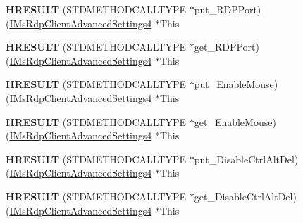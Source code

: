 \begin{DoxyCompactItemize}
{\bfseries H\+R\+E\+S\+U\+LT} (S\+T\+D\+M\+E\+T\+H\+O\+D\+C\+A\+L\+L\+T\+Y\+PE $\ast$put\+\_\+\+R\+D\+P\+Port)(\hyperlink{interface_m_s_t_s_c_lib_1_1_i_ms_rdp_client_advanced_settings4}{I\+Ms\+Rdp\+Client\+Advanced\+Settings4} $\ast$This
\item 
\mbox{\label{struct_m_s_t_s_c_lib_1_1_i_ms_rdp_client_advanced_settings4_vtbl_a57843c0461a2f2fa0a0a93d2d72883d3}} 
{\bfseries H\+R\+E\+S\+U\+LT} (S\+T\+D\+M\+E\+T\+H\+O\+D\+C\+A\+L\+L\+T\+Y\+PE $\ast$get\+\_\+\+R\+D\+P\+Port)(\hyperlink{interface_m_s_t_s_c_lib_1_1_i_ms_rdp_client_advanced_settings4}{I\+Ms\+Rdp\+Client\+Advanced\+Settings4} $\ast$This
\item 
\mbox{\label{struct_m_s_t_s_c_lib_1_1_i_ms_rdp_client_advanced_settings4_vtbl_af6db4a57a211749fb3fb51e3f7d2bc12}} 
{\bfseries H\+R\+E\+S\+U\+LT} (S\+T\+D\+M\+E\+T\+H\+O\+D\+C\+A\+L\+L\+T\+Y\+PE $\ast$put\+\_\+\+Enable\+Mouse)(\hyperlink{interface_m_s_t_s_c_lib_1_1_i_ms_rdp_client_advanced_settings4}{I\+Ms\+Rdp\+Client\+Advanced\+Settings4} $\ast$This
\item 
\mbox{\label{struct_m_s_t_s_c_lib_1_1_i_ms_rdp_client_advanced_settings4_vtbl_a06e4a255400531a4dcf515a2b9b7b2dd}} 
{\bfseries H\+R\+E\+S\+U\+LT} (S\+T\+D\+M\+E\+T\+H\+O\+D\+C\+A\+L\+L\+T\+Y\+PE $\ast$get\+\_\+\+Enable\+Mouse)(\hyperlink{interface_m_s_t_s_c_lib_1_1_i_ms_rdp_client_advanced_settings4}{I\+Ms\+Rdp\+Client\+Advanced\+Settings4} $\ast$This
\item 
\mbox{\label{struct_m_s_t_s_c_lib_1_1_i_ms_rdp_client_advanced_settings4_vtbl_a2f86d8d7ccc194a4d5f890ce3886ef64}} 
{\bfseries H\+R\+E\+S\+U\+LT} (S\+T\+D\+M\+E\+T\+H\+O\+D\+C\+A\+L\+L\+T\+Y\+PE $\ast$put\+\_\+\+Disable\+Ctrl\+Alt\+Del)(\hyperlink{interface_m_s_t_s_c_lib_1_1_i_ms_rdp_client_advanced_settings4}{I\+Ms\+Rdp\+Client\+Advanced\+Settings4} $\ast$This
\item 
\mbox{\label{struct_m_s_t_s_c_lib_1_1_i_ms_rdp_client_advanced_settings4_vtbl_ae4a6bdd4039507ace2b8f10ab3d89f03}} 
{\bfseries H\+R\+E\+S\+U\+LT} (S\+T\+D\+M\+E\+T\+H\+O\+D\+C\+A\+L\+L\+T\+Y\+PE $\ast$get\+\_\+\+Disable\+Ctrl\+Alt\+Del)(\hyperlink{interface_m_s_t_s_c_lib_1_1_i_ms_rdp_client_advanced_settings4}{I\+Ms\+Rdp\+Client\+Advanced\+Settings4} $\ast$This

\end{DoxyCompactItemize}
